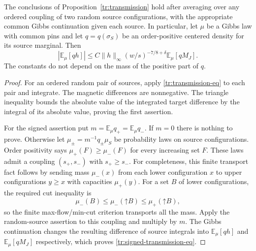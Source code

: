 \begin{corollary}
\label{tr:signed-transmission}
The conclusions of Proposition~\ref{tr:transmission} hold after averaging
over any ordered coupling of two random source configurations, with the
appropriate common Gibbs continuation given each source. In particular,
let $\mu$ be a Gibbs law with common pins and let $q=q(\sigma_S)$ be an
order-positive centered density for its source marginal. Then
\begin{equation}
\label{tr:signed-transmission-eq}
 \left|\mathbb E_\mu[qh]\right|
 \leq C\|h\|_\infty(w/s)^{-7/8+\delta}
                    \mathbb E_\mu[qM_J].
\end{equation}
The constants do not depend on the mass of the positive part of $q$.
\end{corollary}

\begin{proof}
For an ordered random pair of sources, apply
\eqref{tr:transmission-eq} to each pair and integrate. The magnetic
differences are nonnegative. The triangle inequality bounds the absolute
value of the integrated target difference by the integral of its absolute
value, proving the first assertion.

For the signed assertion put $m=\mathbb E_\mu q_+=\mathbb E_\mu q_-$.
If $m=0$ there is nothing to prove. Otherwise let
$\mu_\pm=m^{-1}q_\pm\mu_S$ be probability laws on source configurations.
Order positivity says $\mu_+(F)\geq\mu_-(F)$ for every increasing set $F$.
These laws admit a coupling $(s_+,s_-)$ with $s_+\geq s_-$. For
completeness, this finite transport fact follows by sending mass
$\mu_-(x)$ from each lower configuration $x$ to upper configurations
$y\geq x$ with capacities $\mu_+(y)$. For a set $B$ of lower
configurations, the required cut inequality is
\[
 \mu_-(B)\leq\mu_-(\mathord\uparrow B)
             \leq\mu_+(\mathord\uparrow B),
\]
so the finite max-flow/min-cut criterion transports all the mass.
Apply the random-source assertion to this coupling and multiply by $m$.
The Gibbs continuation changes the resulting difference of source
integrals into $\mathbb E_\mu[qh]$ and $\mathbb E_\mu[qM_J]$ respectively,
which proves \eqref{tr:signed-transmission-eq}.
\end{proof}

